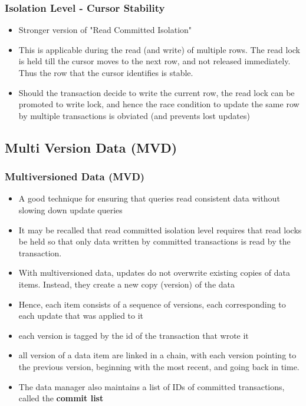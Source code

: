 \documentclass[12]{beamer}
\begin{document}
\begin{frame}
\frametitle{Isolation Level - Cursor Stability}
\begin{itemize}
\item Stronger version of "Read Committed Isolation"
\item This is applicable during the read (and write) of multiple rows. The read lock is held till the cursor moves to the next row, and not released immediately. Thus the row that the cursor identifies is stable.
\item Should the transaction decide to write the current row, the read lock can be promoted to write lock, and hence the race condition to update the same row by multiple transactions is obviated (and prevents lost updates)
\end{itemize}
\end{frame}

\subsection{Multi Version Data (MVD)}

\begin{frame}
\frametitle{Multiversioned Data (MVD)}
\begin{itemize} 
\item A good technique for ensuring that queries read consistent data without slowing down update queries
\item It may be recalled that read committed isolation level requires that read locks be held so that only data written by committed transactions is read by the transaction.
\item With multiversioned data, updates do not overwrite existing copies of data items. Instead, they create a new copy (version) of the data
\item Hence, each item consists of a sequence of versions, each corresponding to each update that was applied to it
\item each version is tagged by the id of the transaction that wrote it
\item all version of a data item are linked in a chain, with each version pointing to the previous version, beginning with the most recent, and going back in time.
\item The data manager also maintains a list of IDs of committed transactions, called the \textbf{commit list}
\end{itemize}
\end{frame}
\end{document}
